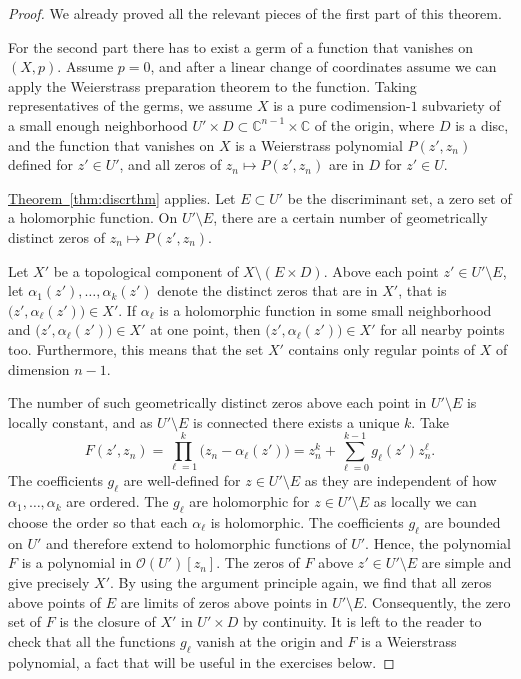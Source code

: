 \documentclass[12pt,openany]{book}
\newcommand{\C}{{\mathbb{C}}}
\newcommand{\sO}{{\mathscr{O}}}
\theoremstyle{plain}
\theoremstyle{remark}
\theoremstyle{definition}
\theoremstyle{exercise}
\theoremstyle{example}
\newcommand{\thmref}[1]{\hyperref[#1]{Theorem~\ref*{#1}}}
\begin{document}
\begin{proof}
We already proved all the relevant pieces of the first part of this
theorem.

For the second part there has to exist a germ of a function that vanishes on
$(X,p)$.  Assume $p=0$, and after a linear change
of coordinates assume we can apply the Weierstrass preparation theorem
to the function.  Taking representatives of the germs, we assume
$X$ is a pure codimension-$1$ subvariety of a small enough
neighborhood
$U' \times D \subset \C^{n-1} \times \C$ of the origin, where $D$ is a disc,
and the function that vanishes on $X$ is a
Weierstrass polynomial $P(z',z_n)$ defined for $z' \in U'$, and
all zeros of $z_n \mapsto P(z',z_n)$ are in $D$ for $z' \in U$.

\thmref{thm:discrthm} applies. Let
$E \subset U'$ be the discriminant set, a zero set of a
holomorphic function.
On $U' \setminus E$, there are a certain number of geometrically
distinct zeros of $z_n \mapsto P(z',z_n)$.

Let $X'$ be a topological component of $X \setminus ( E \times D )$.
Above each point $z' \in U' \setminus E$, let
$\alpha_1(z'),\ldots,\alpha_k(z')$ denote the distinct zeros that are in $X'$,
that is $\bigl(z',\alpha_\ell(z')\bigr) \in X'$.
If $\alpha_\ell$ is a holomorphic function in some small neighborhood and
$\bigl(z',\alpha_\ell(z')\bigr) \in X'$ at one point, then
$\bigl(z',\alpha_\ell(z')\bigr) \in X'$ for all nearby points too.
Furthermore, this means that the set $X'$ contains only regular points of $X$ of
dimension $n-1$.

The number of
such geometrically distinct zeros above each point in
$U' \setminus E$ is locally constant, and as $U' \setminus E$ is connected
there exists a unique $k$.  Take
\begin{equation*}
F(z',z_n) = \prod_{\ell=1}^k \bigl( z_n-\alpha_\ell(z')\bigr)
=
z_n^k + \sum_{\ell=0}^{k-1} g_\ell(z') z_n^\ell .
\end{equation*}
The coefficients $g_\ell$ are well-defined for $z \in U' \setminus E$
as they are independent of how $\alpha_1,\ldots,\alpha_k$ are ordered.
The $g_\ell$ are holomorphic for $z \in U' \setminus E$
as locally we can choose the order so that each $\alpha_\ell$ is
holomorphic.
The coefficients $g_\ell$ are bounded
on $U'$ and therefore extend to holomorphic functions of $U'$.
Hence, the polynomial $F$ is a polynomial
in $\sO(U')[z_n]$.
The zeros of $F$
above $z' \in U' \setminus E$
are simple and give precisely $X'$.
By using the argument principle
again, we find that all zeros above points of $E$ are limits of zeros
above points in $U' \setminus E$.
Consequently,
the zero set of $F$ is the closure of $X'$ in $U' \times D$ by continuity.
It is left to the reader to check that %
all the functions $g_\ell$ vanish at the origin and $F$ is a Weierstrass
polynomial, a fact that will be useful in the exercises below.


\end{proof}
\end{document}
